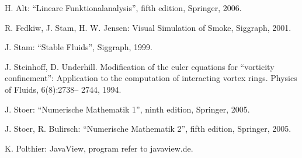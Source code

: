 \documentclass[a4paper,10pt,oneside,final,german,openbib,pdftex,titlepage]{scrbook}
\begin{document}
\begin{appendix}


\renewcommand{\bibname}{\bfont Reference List} 

\begin{thebibliography}{99}

H. Alt: ``Lineare Funktionalanalysis'', fifth edition, Springer, 2006.

R. Fedkiw, J. Stam, H. W. Jensen: Visual Simulation of Smoke, Siggraph, 2001.

J. Stam: ``Stable Fluids'', Siggraph, 1999.

J. Steinhoff, D. Underhill. Modification of the euler equations
for “vorticity confinement”: Application to the computation
of interacting vortex rings. Physics of Fluids, 6(8):2738–
2744, 1994.

J. Stoer: ``Numerische Mathematik 1'', ninth edition, Springer, 2005.

J. Stoer, R. Bulirsch: ``Numerische Mathematik 2'', fifth edition, Springer, 2005.

K. Polthier: JavaView, program refer to javaview.de.

\end{thebibliography}
\end{appendix}
\end{document}
